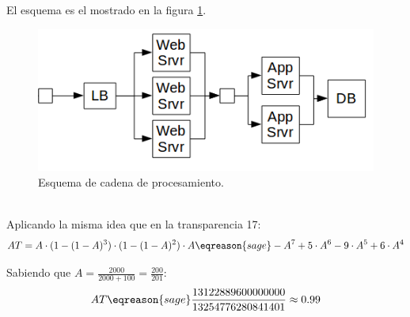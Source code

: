 \begin{problem}[7]
\spart
El esquema es el mostrado en la figura \ref{tema3:prob7:esquema}.
\begin{figure}[hbtp]
	\centering
	\includegraphics[keepaspectratio=true,width=\linewidth]{img/tema3_ej7.png}
	\caption{Esquema de cadena de procesamiento.}
	\label{tema3:prob7:esquema}
\end{figure}
$ $\\
\spart
Aplicando la misma idea que en la transparencia 17:
\[ AT = A \cdot (1 - (1 - A)^3) \cdot (1 - (1 - A)^2) \cdot A \eqreason{sage} -A^7 + 5\cdot A^6 - 9\cdot A^5 + 6\cdot A^4 \]

\spart
Sabiendo que $A = \frac{2000}{2000+100} = \frac{200}{201}$:
\[ AT \eqreason{sage} \frac{13122889600000000}{13254776280841401} \approx 0.99 \]
\end{problem}


